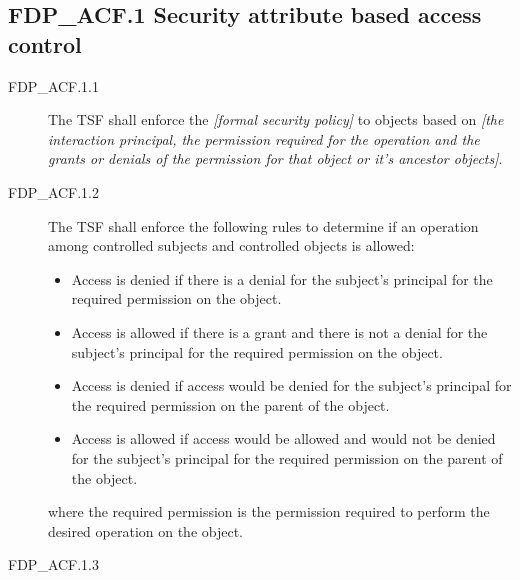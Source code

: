 \documentclass[10pt,a4paper,english]{book}
\begin{document}

\hypertarget{fdp-acf-1-security-attribute-based-access-control}{}
\subsection{FDP{\_}ACF.1 Security attribute based access control}
\begin{description}
\item[FDP{\_}ACF.1.1]

The TSF shall enforce the \emph{{[}formal security policy]} to objects
based on \emph{{[}the interaction principal, the permission required for
the operation and the grants or denials of the permission for that
object or it's ancestor objects]}.

\item[FDP{\_}ACF.1.2]

The TSF shall enforce the following rules to determine
if an operation among controlled subjects and controlled objects is
allowed:
\begin{itemize}
\item {} 
Access is denied if there is a denial for the subject's
principal for the required permission on the object.

\item {} 
Access is allowed if there is a grant and there is not a denial
for the subject's principal for the required permission on the object.

\item {} 
Access is denied if access would be denied for the subject's
principal for the required permission on the parent of the
object.

\item {} 
Access is allowed if access would be allowed and would not be
denied for the subject's principal for the required permission
on the parent of the object.

\end{itemize}

where the required permission is the permission required to
perform the desired operation on the object.

\item[FDP{\_}ACF.1.3]


\end{description}
\end{document}
